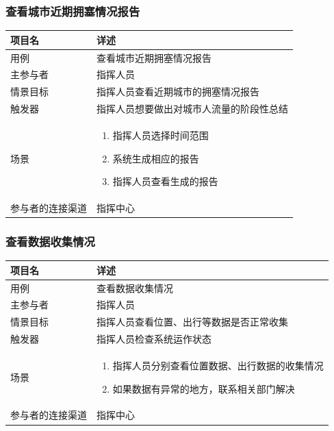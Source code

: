 \documentclass{ctexrep}
\begin{document}
\subsubsection{查看城市近期拥塞情况报告}
\begin{longtable}{p{2cm} | p{10cm}}
\hline
项目名 & 详述 \\
\hline
\hline
用例 & 查看城市近期拥塞情况报告\\
\hline
主参与者 & 指挥人员 \\
\hline
情景目标 &  指挥人员查看近期城市的拥塞情况报告\\
\hline
触发器 &  指挥人员想要做出对城市人流量的阶段性总结\\
\hline
场景 & \begin{enumerate}
	\item 指挥人员选择时间范围
	\item 系统生成相应的报告
	\item 指挥人员查看生成的报告
\end{enumerate} \\
\hline
参与者的连接渠道 & 指挥中心 \\
\hline
\end{longtable}

\subsubsection{查看数据收集情况}
\begin{longtable}{p{2cm} | p{10cm}}
\hline
项目名 & 详述 \\
\hline
\hline
用例 & 查看数据收集情况\\
\hline
主参与者 & 指挥人员 \\
\hline
情景目标 &  指挥人员查看位置、出行等数据是否正常收集\\
\hline
触发器 &  指挥人员检查系统运作状态\\
\hline
场景 & \begin{enumerate}
	\item 指挥人员分别查看位置数据、出行数据的收集情况
	\item 如果数据有异常的地方，联系相关部门解决
\end{enumerate} \\
\hline
参与者的连接渠道 & 指挥中心 \\
\hline
\end{longtable}
\end{document}
